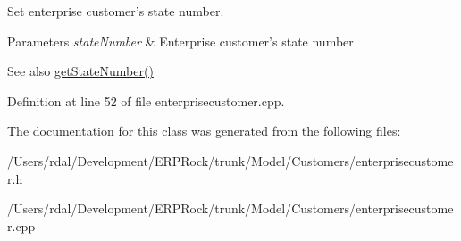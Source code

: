 \-Set enterprise customer's state number. 


\begin{DoxyParams}{\-Parameters}
{\em state\-Number} & \-Enterprise customer's state number \\
\hline
\end{DoxyParams}
\begin{DoxySeeAlso}{\-See also}
\hyperlink{class_enterprise_customer_a5513db274ebf2bc0c2f17b311161534f}{get\-State\-Number()} 
\end{DoxySeeAlso}


\-Definition at line 52 of file enterprisecustomer.\-cpp.



\-The documentation for this class was generated from the following files\-:\begin{DoxyCompactItemize}
\item 
/\-Users/rdal/\-Development/\-E\-R\-P\-Rock/trunk/\-Model/\-Customers/enterprisecustomer.\-h\item 
/\-Users/rdal/\-Development/\-E\-R\-P\-Rock/trunk/\-Model/\-Customers/enterprisecustomer.\-cpp\end{DoxyCompactItemize}
